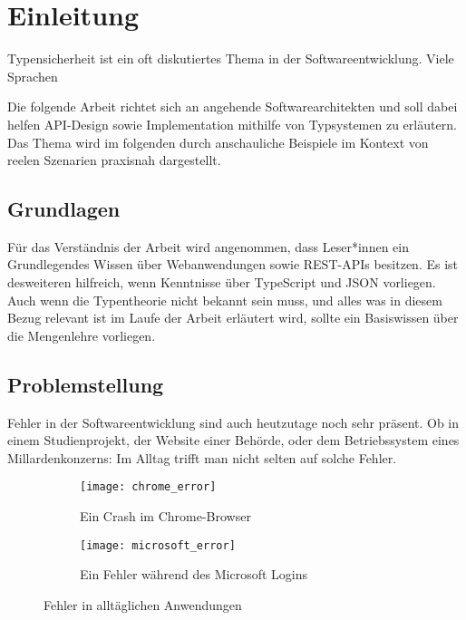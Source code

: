 \section{Einleitung} 


Typensicherheit ist ein oft diskutiertes Thema in der Softwareentwicklung. 
Viele Sprachen 

Die folgende Arbeit richtet sich an angehende Softwarearchitekten und soll dabei helfen API-Design sowie Implementation
mithilfe von Typsystemen zu erläutern.
Das Thema wird im folgenden durch anschauliche Beispiele im Kontext von reelen Szenarien praxisnah dargestellt.

\subsection{Grundlagen}

Für das Verständnis der Arbeit wird angenommen,
dass Leser*innen ein Grundlegendes Wissen über Webanwendungen sowie REST-APIs besitzen.
Es ist desweiteren hilfreich, wenn Kenntnisse über TypeScript und JSON vorliegen.
Auch wenn die Typentheorie nicht bekannt sein muss, und alles was in diesem Bezug relevant ist im 
Laufe der Arbeit erläutert wird, sollte ein Basiswissen über die Mengenlehre vorliegen.


\subsection{Problemstellung}

Fehler in der Softwareentwicklung sind auch heutzutage noch sehr präsent. Ob in einem Studienprojekt, der Website einer Behörde,
oder dem Betriebssystem eines Millardenkonzerns: Im Alltag trifft man nicht selten auf solche Fehler.

\begin{figure}[H]
  \centering
  \begin{subfigure}[b]{0.4\linewidth}
    \texttt{[image: chrome\_error]}
    \caption{Ein Crash im Chrome-Browser}
  \end{subfigure}
  \hspace{0.5cm}
  \begin{subfigure}[b]{0.4\linewidth}
    \texttt{[image: microsoft\_error]}
    \caption{Ein Fehler während des Microsoft Logins}
  \end{subfigure}
  \caption{Fehler in alltäglichen Anwendungen}
\end{figure}

